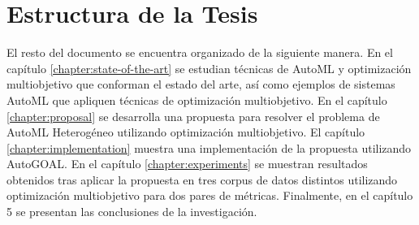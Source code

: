 \section*{Estructura de la Tesis}
El resto del documento se encuentra organizado de la siguiente manera. En el cap\'itulo \ref{chapter:state-of-the-art} se estudian t\'ecnicas de AutoML y optimizaci\'on multiobjetivo que conforman el estado del arte, as\'i como ejemplos de sistemas AutoML que apliquen t\'ecnicas de optimizaci\'on multiobjetivo. En el cap\'itulo \ref{chapter:proposal} se desarrolla una propuesta para resolver el problema de AutoML Heterog\'eneo utilizando optimizaci\'on multiobjetivo. El cap\'itulo \ref{chapter:implementation} muestra una implementaci\'on de la propuesta utilizando AutoGOAL. En el cap\'itulo \ref{chapter:experiments} se muestran resultados obtenidos tras aplicar la propuesta en tres corpus de datos distintos utilizando optimizaci\'on multiobjetivo para dos pares de m\'etricas. 
Finalmente, en el cap\'itulo 5 se presentan las conclusiones de la investigaci\'on.

